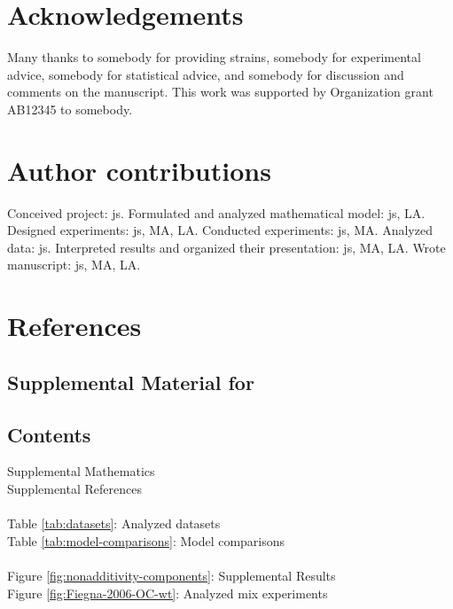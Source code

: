 \documentclass[11pt]{article}
\begin{document}
\section{Acknowledgements}

Many thanks to somebody for providing strains, somebody for experimental advice, somebody for statistical advice, and somebody for discussion and comments on the manuscript. This work was supported by Organization grant AB12345 to somebody.

\section{Author contributions}

Conceived project: js. Formulated and analyzed mathematical model: js, LA. Designed experiments: js, MA, LA. Conducted experiments: js, MA. Analyzed data: js. Interpreted results and organized their presentation: js, MA, LA. Wrote manuscript: js, MA, LA. 



\section*{References}




\appendix

\clearpage
\setcounter{page}{1}
\renewcommand{\thefigure}{S\arabic{figure}}
\setcounter{figure}{0}
\renewcommand{\theequation}{S\arabic{equation}}
\setcounter{equation}{0}
\renewcommand{\thetable}{S\arabic{table}}
\setcounter{table}{0}

\subsection{Supplemental Material for}
\maketitle

\subsection{Contents}
Supplemental Mathematics \dotfill \pageref{sec:supplemental-math} \\
Supplemental References \dotfill \pageref{sec:supplemental-references} \\
\\
Table \ref{tab:datasets}: Analyzed datasets 
	\dotfill \pageref{tab:datasets} \\
Table \ref{tab:model-comparisons}: Model comparisons 
	\dotfill \pageref{tab:model-comparisons} \\
\\
Figure \ref{fig:nonadditivity-components}: Supplemental Results
	\dotfill \pageref{fig:nonadditivity-components}\\
Figure \ref{fig:Fiegna-2006-OC-wt}: Analyzed mix experiments
	\dotfill \pageref{fig:Fiegna-2006-OC-wt}\\
\end{document}

